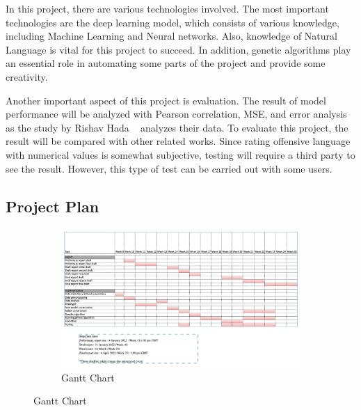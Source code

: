 \documentclass[11pt, natbib=false]{article}
\begin{document}
\begin{multicols}{2}
In this project, there are various technologies involved.
The most important technologies are the deep learning model, which consists of various knowledge, including Machine Learning and Neural networks.
Also, knowledge of Natural Language is vital for this project to succeed.
In addition, genetic algorithms play an essential role in automating some parts of the project and provide some creativity.

Another important aspect of this project is evaluation.
The result of model performance will be analyzed with Pearson correlation, MSE, and error analysis as the study by Rishav Hada ~\cite{hada2021ruddit} analyzes their data.
To evaluate this project, the result will be compared with other related works.
Since rating offensive language with numerical values is somewhat subjective, testing will require a third party to see the result.
However, this type of test can be carried out with some users. 

\subsection{Project Plan}
\begin{figure}[h!]
  \centering
  \begin{subfigure}[b]{1.0\linewidth}
    \includegraphics[width=\linewidth]{./gantt.png}
    \caption{Gantt Chart}
  \end{subfigure}
  \label{ganttChart}
\end{figure}


\end{multicols}
\end{document}
